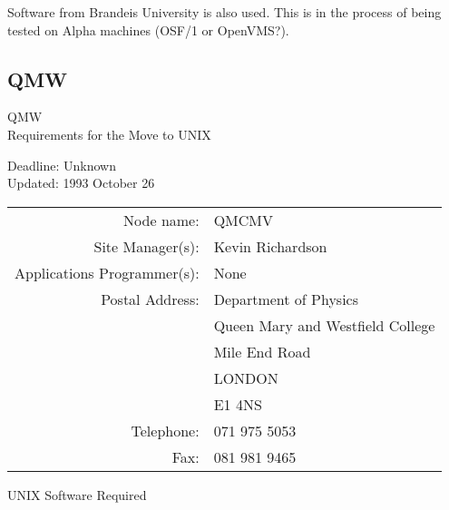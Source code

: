 Software from Brandeis University is also used.
This is in the process of being tested on Alpha machines (OSF/1 or OpenVMS?).


\newpage
\subsection{QMW}

\renewcommand{\starsitename}{QMW}
\renewcommand{\starnodename}{QMCMV}

\renewcommand{\starunixdate}{Unknown}
\renewcommand{\starupdate}{1993 October 26}

\renewcommand{\starsitetelephone}{071 975 5053}
\renewcommand{\starsitefax}{081 981 9465}

\begin{center}
{\Large\sc \starsitename \\ [2ex]
           Requirements for the Move to UNIX}

\vspace{3mm}
{\large\sc Deadline: \starunixdate \\ [1ex]
           Updated: \starupdate}
\end{center}

\vspace{5mm}

\begin{center}
\begin{tabular}{rl}
{\sc Node name:}                  & \starnodename \\
{\sc Site Manager(s):}            & Kevin Richardson \\
{\sc Applications Programmer(s):} & None \\
{\sc Postal Address:}             & Department of Physics \\
                                  & Queen Mary and Westfield College \\
                                  & Mile End Road \\
                                  & LONDON \\
                                  & E1 4NS \\
{\sc Telephone:}                  & \starsitetelephone \\
{\sc Fax:}                        & \starsitefax \\
\end{tabular}
\end{center}

\vspace{5mm}
\begin{center}
{\large\sc UNIX Software Required}
\end{center}

